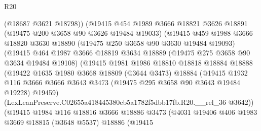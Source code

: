 \begin{lexlean}{R20}
\begin{coremodule}
                        (@18687 @3621 @18798))
                      (@19415
                        @454
                        @1989
                        @3666
                        @18821
                        @3626
                        @18891
                        (@19475 @200 @3658 @90 @3626 @19484 @19033)
                        (@19415
                          @459
                          @1988
                          @3666
                          @18820
                          @3630
                          @18890
                          (@19475 @250 @3658 @90 @3630 @19484 @19093)
                          (@19415
                            @464
                            @1987
                            @3666
                            @18819
                            @3634
                            @18889
                            (@19475 @275 @3658 @90 @3634 @19484 @19108)
                            (@19415
                              @1981
                              @1986
                              @18810
                              @18818
                              @18884
                              @18888
                              (@19422
                                @1635
                                @1980
                                @3668
                                @18809
                                (@3644 @3473)
                                @18884
                                (@19415
                                  @1932
                                  @116
                                  @3666
                                  @3666
                                  @3643
                                  @3473
                                  (@19475 @295 @3658 @90 @3643 @19484 @19228)
                                  @19459)
                                (LexLeanPreserve.C02655a418445380eb5a1782f5dbb17fb.R20.__rel_36
                                  @3642))
                              (@19415
                                @1984
                                @116
                                @18816
                                @3666
                                @18886
                                @3473
                                (@4031
                                  @19406
                                  @406
                                  @1983
                                  @3669
                                  @18815
                                  (@3648 @5537)
                                  @18886
                                  (@19415

\end{coremodule}
\end{lexlean}
